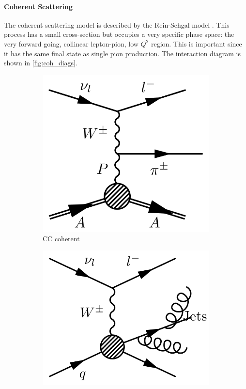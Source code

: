 \paragraph{Coherent Scattering}
The coherent scattering model is described by the Rein-Sehgal model \cite{Rein_Sehgal_coh}. This process has a small cross-section but occupies a very specific phase space: the very forward going, collinear lepton-pion, low $Q^2$ region. This is important since it has the same final state as single pion production. The interaction diagram is shown in \autoref{fig:coh_diags}.
\begin{figure}[h]
	\centering
	\begin{subfigure}[t]{0.42\textwidth}
		\includegraphics[width=\textwidth, trim={0mm 0mm 0mm 0mm}, clip,page=1]{figures/niwg/diagrams/CCcoh}
		\caption{CC coherent}
		\label{fig:coh_diags}
	\end{subfigure}
	\begin{subfigure}[t]{0.42\textwidth}
		\includegraphics[width=\textwidth, trim={0mm 0mm 0mm 0mm}, clip,page=1]{figures/niwg/diagrams/CCmultipion}

\end{subfigure}
\end{figure}
